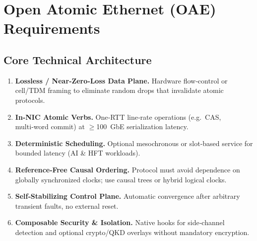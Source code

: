 \section{Open Atomic Ethernet (OAE) Requirements}


%

\subsection{Core Technical Architecture}
\begin{enumerate}
\item \textbf{Lossless / Near‑Zero‑Loss Data Plane.} Hardware flow‑control or cell/TDM framing to eliminate random drops that invalidate atomic protocols.
\item \textbf{In‑NIC Atomic Verbs.} One‑RTT line‑rate operations (e.g.\ CAS, multi‑word commit) at $\ge$100 GbE serialization latency.
\item \textbf{Deterministic Scheduling.} Optional mesochronous or slot‑based service for bounded latency (AI \& HFT workloads).
\item \textbf{Reference‑Free Causal Ordering.} Protocol must avoid dependence on globally synchronized clocks; use causal trees or hybrid logical clocks.
\item \textbf{Self‑Stabilizing Control Plane.} Automatic convergence after arbitrary transient faults, no external reset.
\item \textbf{Composable Security \& Isolation.} Native hooks for side‑channel detection and optional crypto/QKD overlays without mandatory encryption.
\end{enumerate}

